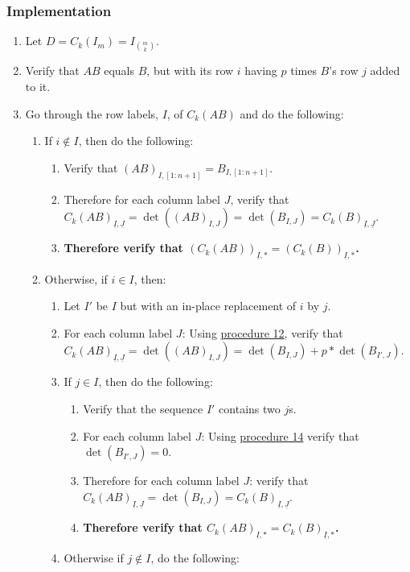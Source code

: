 \documentclass[twocolumn]{article}
\newcommand{\ul}[1]{\underline{#1}}
\begin{document}
			\subsubsection{Implementation}
				\begin{enumerate}
					\item Let $D=C_k(I_m)=I_{\binom{m}{k}}$.
					\item Verify that $AB$ equals $B$, but with its row $i$ having $p$ times $B$'s row $j$ added to it.
					\item Go through the row labels, $I$, of $C_k(AB)$ and do the following:
					\begin{enumerate}
						\item If $i\notin I$, then do the following:
						\begin{enumerate}
							\item Verify that $(AB)_{I,[1:n+1]}=B_{I,[1:n+1]}$.
							\item Therefore for each column label $J$, verify that ${C_k(AB)}_{\ul{I},\ul{J}}=\det((AB)_{I,J})=\det(B_{I,J})={C_k(B)}_{\ul{I},\ul{J}}$.
							\item \textbf{Therefore verify that $(C_k(AB))_{\ul{I},*}=(C_k(B))_{\ul{I},*}$.}
						\end{enumerate}
						\item Otherwise, if $i\in I$, then:
						\begin{enumerate}
							\item Let $I'$ be $I$ but with an in-place replacement of $i$ by $j$.
							\item For each column label $J$: Using \hyperref[sec:procedure 12]{procedure 12}, verify that ${C_k(AB)}_{\ul{I},\ul{J}}=\det((AB)_{I,J})=\det(B_{I,J})+p*\det(B_{I',J})$.
							\item If $j\in I$, then do the following:
							\begin{enumerate}
								\item Verify that the sequence $I'$ contains two $j$s.
								\item For each column label $J$: Using \hyperref[sec:procedure 14]{procedure 14} verify that $\det(B_{I',J})=0$.
								\item Therefore for each column label $J$: verify that ${C_k(AB)}_{\ul{I},\ul{J}}=\det(B_{I,J})={C_k(B)}_{\ul{I},\ul{J}}$.
								\item \textbf{Therefore verify that ${C_k(AB)}_{\ul{I},*}={C_k(B)}_{\ul{I},*}$.}
							\end{enumerate}
							\item Otherwise if $j\notin I$, do the following:

\end{enumerate}
\end{enumerate}
\end{enumerate}
\end{document}
